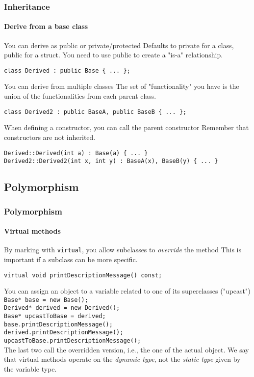 \begin{frame}
\frametitle{Inheritance}
\framesubtitle{Derive from a base class}

\begin{block}{You can derive as public or private/protected}
Defaults to private for a class, public for a struct. You need to use public to create a "is-a" relationship.

{\scriptsize 
\texttt{class Derived : public Base \{ ... \}; }
}
\end{block}
\pause
\begin{block}{You can derive from multiple classes}
The set of "functionality" you have is the union of the functionalities from each parent class.

{\scriptsize 
\texttt{class Derived2 : public BaseA, public BaseB \{ ... \}; }
}
\end{block}
\pause
\begin{block}{When defining a constructor, you can call the parent constructor}
Remember that constructors are not inherited.

\medskip

{\scriptsize 
\texttt{Derived::Derived(int a) : Base(a) \{ ... \} } \\
\texttt{Derived2::Derived2(int x, int y) : BaseA(x), BaseB(y) \{ ... \} }
}
\end{block}
\end{frame}

\subsection{Polymorphism}

\begin{frame}[fragile]
\frametitle{Polymorphism}
\framesubtitle{Virtual methods}

\begin{block}{By marking with \texttt{virtual}, you allow subclasses to {\em override} the method}
This is important if a subclass can be more specific.

{\scriptsize 
\texttt{virtual void printDescriptionMessage() const; }
}
\end{block}
\pause
\begin{block}{You can assign an object to a variable related to one of its superclasses ("upcast")}
{\scriptsize 
\texttt{Base* base = new Base(); } \\
\texttt{Derived* derived = new Derived(); } \\
\texttt{Base* upcastToBase = derived; } \\
\texttt{base.printDescriptionMessage(); } \\
\texttt{derived.printDescriptionMessage(); } \\
\texttt{upcastToBase.printDescriptionMessage(); } \\
}
The last two call the overridden version, i.e., the one of the actual object. We say that 
virtual methods operate on the {\em dynamic type}, not the {\em static type} given by the variable type.
\end{block}

\end{frame}

